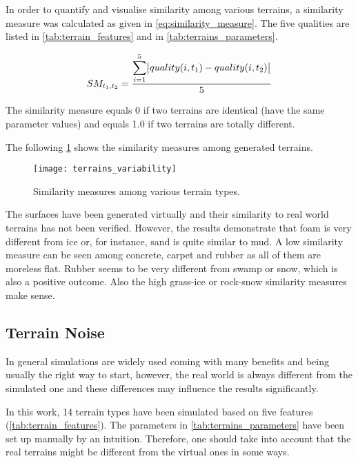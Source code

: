 In order to quantify and visualise similarity among various terrains, a similarity measure was calculated as given in \cref{eq:similarity_measure}. The five qualities are listed in \cref{tab:terrain_features} and in \cref{tab:terrains_parameters}.

\begin{align} \label{eq:similarity_measure}
  SM_{t_1, t_2} = \frac{\displaystyle\sum_{i=1}^{5} \abs{quality(i, t_1) - quality(i, t_2)}}{5}
\end{align} 

The similarity measure equals 0 if two terrains are identical (have the same parameter values) and equals 1.0 if two terrains are totally different.

The following \cref{fig:terrain_similarity_measures} shows the similarity measures among generated terrains.

\begin{figure}[H]
  \centering
  \texttt{[image: terrains\_variability]}
  \caption{Similarity measures among various terrain types.}
  \label{fig:terrain_similarity_measures}
\end{figure}

The surfaces have been generated virtually and their similarity to real world terrains has not been verified. However, the results demonstrate that foam is very different from ice or, for instance, sand is quite similar to mud. A low similarity measure can be seen among concrete, carpet and rubber as all of them are moreless flat. Rubber seems to be very different from swamp or snow, which is also a positive outcome. Also the high grass-ice or rock-snow similarity measures make sense. 

\subsection{Terrain Noise} \label{ssec:terrain_noise}
In general simulations are widely used coming with many benefits and being usually the right way to start, however, the real world is always different from the simulated one and these differences may influence the results significantly.

In this work, 14 terrain types have been simulated based on five features (\cref{tab:terrain_features}). The parameters in \cref{tab:terrains_parameters} have been set up manually by an intuition. Therefore, one should take into account that the real terrains might be different from the virtual ones in some ways.

